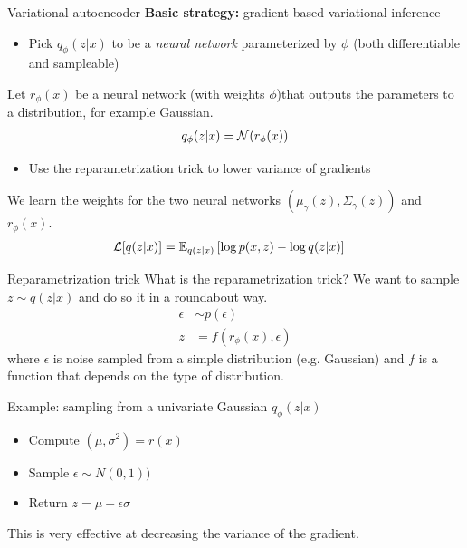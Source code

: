 \documentclass[10pt, compress]{beamer}
\begin{document}
\begin{frame}{Variational autoencoder}
  \textbf{Basic strategy:} gradient-based variational inference

  \pause

  \begin{itemize}
    \item Pick $q_\phi(z | x)$ to be a \emph{neural network} parameterized by $\phi$ (both differentiable and sampleable)
  \end{itemize}

  \pause
  Let $r_\phi(x)$ be a neural network (with weights $\phi$)that outputs the parameters to a distribution, for example Gaussian.
  \begin{align*}
    q_\phi(z | x) = \mathcal{N}(r_\phi(x))
  \end{align*}

  \pause

  \begin{itemize}
    \item Use the reparametrization trick to lower variance of gradients
  \end{itemize}
  \pause
  We learn the weights for the two neural networks $(\mu_\gamma(z), \Sigma_\gamma(z))$ and $r_\phi(x)$.
  \pause
  \begin{align*}
    \mathcal{L}[q(z | x)] &= \mathbb{E}_{q(z | x)}\left[\log p(x, z) - \log q(z | x)\right]
  \end{align*}
\end{frame}

\begin{frame}{Reparametrization trick}
  What is the reparametrization trick?
  \pause
  We want to sample $z \sim q(z | x)$ and do so
  it in a roundabout way.
  \begin{align*}
    \epsilon &\sim p(\epsilon) \\
    z &= f(r_\phi(x), \epsilon)
  \end{align*}
  where $\epsilon$ is noise sampled from a simple distribution (e.g. Gaussian)
  and $f$ is a function that depends on the type of distribution.
  \pause
  \begin{block}{Example: sampling from a univariate Gaussian $q_\phi(z | x)$}
    \begin{itemize}
  \pause
      \item Compute $(\mu, \sigma^2) = r(x)$
  \pause
      \item Sample $\epsilon \sim N(0, 1))$
  \pause
      \item Return $z = \mu + \epsilon\sigma$
    \end{itemize}
  \end{block}
  \pause
  This is very effective at decreasing the variance of the gradient.
\end{frame}
\end{document}
